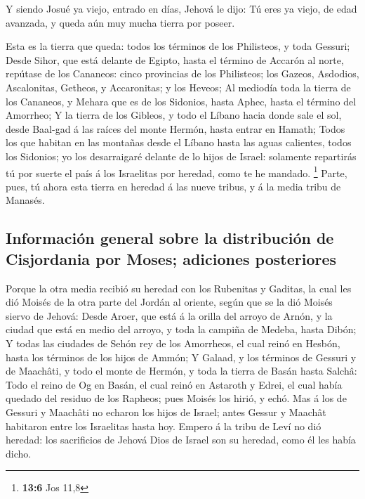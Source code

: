  Y siendo Josué ya viejo, entrado en días, Jehová le dijo:
Tú eres ya viejo, de edad avanzada, y queda aún muy mucha tierra por
poseer.

 Esta es la tierra que queda: todos los términos de los
Philisteos, y toda Gessuri;  Desde Sihor, que está delante
de Egipto, hasta el término de Accarón al norte, repútase de los
Cananeos: cinco provincias de los Philisteos; los Gazeos, Asdodios,
Ascalonitas, Getheos, y Accaronitas; y los Heveos;  Al
mediodía toda la tierra de los Cananeos, y Mehara que es de los
Sidonios, hasta Aphec, hasta el término del Amorrheo;  Y la
tierra de los Gibleos, y todo el Líbano hacia donde sale el sol, desde
Baal-gad á las raíces del monte Hermón, hasta entrar en Hamath;
 Todos los que habitan en las montañas desde el Líbano hasta
las aguas calientes, todos los Sidonios; yo los desarraigaré delante de
lo hijos de Israel: solamente repartirás tú por suerte el país á los
Israelitas por heredad, como te he mandado. \footnote{\textbf{13:6} Jos
  11,8}  Parte, pues, tú ahora esta tierra en heredad á las
nueve tribus, y á la media tribu de Manasés.

\hypertarget{informaciuxf3n-general-sobre-la-distribuciuxf3n-de-cisjordania-por-moses-adiciones-posteriores}{%
\subsection{Información general sobre la distribución de Cisjordania por
Moses; adiciones
posteriores}\label{informaciuxf3n-general-sobre-la-distribuciuxf3n-de-cisjordania-por-moses-adiciones-posteriores}}

 Porque la otra media recibió su heredad con los Rubenitas y
Gaditas, la cual les dió Moisés de la otra parte del Jordán al oriente,
según que se la dió Moisés siervo de Jehová:  Desde Aroer,
que está á la orilla del arroyo de Arnón, y la ciudad que está en medio
del arroyo, y toda la campiña de Medeba, hasta Dibón;  Y
todas las ciudades de Sehón rey de los Amorrheos, el cual reinó en
Hesbón, hasta los términos de los hijos de Ammón;  Y
Galaad, y los términos de Gessuri y de Maachâti, y todo el monte de
Hermón, y toda la tierra de Basán hasta Salchâ:  Todo el
reino de Og en Basán, el cual reinó en Astaroth y Edrei, el cual había
quedado del residuo de los Rapheos; pues Moisés los hirió, y echó.
 Mas á los de Gessuri y Maachâti no echaron los hijos de
Israel; antes Gessur y Maachât habitaron entre los Israelitas hasta hoy.
 Empero á la tribu de Leví no dió heredad: los sacrificios
de Jehová Dios de Israel son su heredad, como él les había dicho.

